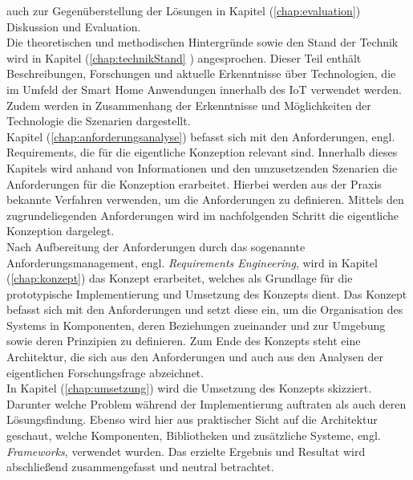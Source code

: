     auch zur Gegenüberstellung der Lösungen in Kapitel (\ref{chap:evaluation}) Diskussion und Evaluation. 
    \\
    \linebreak
    Die theoretischen und methodischen Hintergründe sowie den Stand der Technik wird in Kapitel (\ref{chap:technikStand} )
    angesprochen. Dieser Teil enthält Beschreibungen, Forschungen und aktuelle Erkenntnisse über Technologien, die im Umfeld der 
    Smart Home Anwendungen innerhalb des \acs{IoT} verwendet werden. Zudem werden in Zusammenhang der Erkenntnisse und 
    Möglichkeiten der Technologie die Szenarien dargestellt. 
    \\
    \linebreak
    Kapitel (\ref{chap:anforderungsanalyse}) befasst sich mit den Anforderungen, engl. Requirements, die für die 
    eigentliche Konzeption relevant sind. Innerhalb dieses Kapitels wird anhand von Informationen und den umzusetzenden 
    Szenarien die Anforderungen für die Konzeption erarbeitet. Hierbei werden aus der Praxis bekannte Verfahren verwenden, um 
    die Anforderungen zu definieren. Mittels den zugrundeliegenden Anforderungen wird im nachfolgenden Schritt die eigentliche 
    Konzeption dargelegt.
    \\
    \linebreak 
    Nach Aufbereitung der Anforderungen durch das sogenannte Anforderungsmanagement, engl. \textit{Requirements Engineering},
    wird in Kapitel (\ref{chap:konzept}) das Konzept erarbeitet, welches als Grundlage für die prototypische Implementierung und 
    Umsetzung des Konzepts dient. Das Konzept befasst sich mit den Anforderungen und setzt diese ein, um die Organisation des 
    Systems in Komponenten, deren Beziehungen zueinander und zur Umgebung sowie deren Prinzipien zu definieren. Zum Ende des 
    Konzepts steht eine Architektur, die sich aus den Anforderungen und auch aus den Analysen der eigentlichen Forschungsfrage 
    abzeichnet.
    \\
    \linebreak
    In Kapitel (\ref{chap:umsetzung}) wird die Umsetzung des Konzepts skizziert. Darunter welche Problem während der Implementierung 
    auftraten als auch deren Lösungsfindung. Ebenso wird hier aus praktischer Sicht auf die Architektur geschaut, welche Komponenten,  
    Bibliotheken und zusätzliche Systeme, engl. \textit{Frameworks}, verwendet wurden. Das erzielte Ergebnis und Resultat wird 
    abschließend zusammengefasst und neutral betrachtet.
